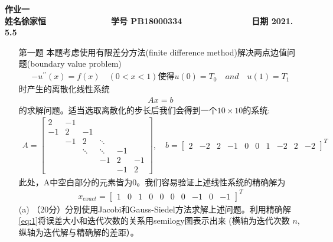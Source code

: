 \documentclass[12pt,a4paper,UTF8]{ctexart}
\begin{document}


\begin{center}
\textbf{作业一}\\
\textbf{姓名\quad 徐家恒~~~~~~~~~~~~~ 学号 PB18000334~~~~~~~~~~~~~~ 日期 2021.	5.5}\\
\end{center}

\begin{center}
\fbox{
\begin{minipage}{40em}
\vspace{5cm}
\hspace{20cm}
\end{minipage}}
\end{center}
\vspace{1cm}

\begin{enumerate}
	\item[第一题]
	本题考虑使用有限差分方法(finite difference method)解决两点边值问题(boundary value problem)
	\begin{eqnarray*}
		-u^{\prime\prime}(x)=f(x)\quad(0<x<1)\text{使得}u(0)=T_0 \quad and\quad u(1)=T_1
	\end{eqnarray*}
	时产生的离散化线性系统
	\begin{eqnarray*}
		Ax=b
	\end{eqnarray*}	
	的求解问题。适当选取离散化的步长后我们会得到一个$10\times10$的系统:
	\begin{eqnarray*}
		A=\left[\begin{array}{llllll}
			2   & -1 &        &        &    &    \\
	        -1  & 2  & -1     &        &    &    \\
           		& -1 & 2      & \ddots &    &    \\
            	&    & \ddots & \ddots & -1 &    \\
            	&    &        & -1     & 2  & -1 \\
            	&    &        &        & -1 & 2
		\end{array}\right],\quad
		b=\left[\begin{array}{rrrrrrrrrr}
        	2 & -2 & 2 & -1 & 0 & 0 & 1 & -2 & 2 & -2
		\end{array}\right]^T
	\end{eqnarray*}
	此处，A中空白部分的元素皆为0。我们容易验证上述线性系统的精确解为
	\begin{eqnarray}\label{eq:1}
		x_{exact}=\left[\begin{array}{cccccccccc}
       		1 & 0 & 1 & 0 & 0 & 0 & 0 & -1 & 0 & -1
		\end{array}\right]^T
	\end{eqnarray}
	(a) （20分）分别使用Jacobi和Gauss-Siedel方法求解上述问题。利用精确解\eqref{eq:1}将误差大小和迭代次数的关系用semilogy图表示出来 (横轴为迭代次数 $n$, 纵轴为迭代解与精确解的差距）。



\end{enumerate}
\end{document}
